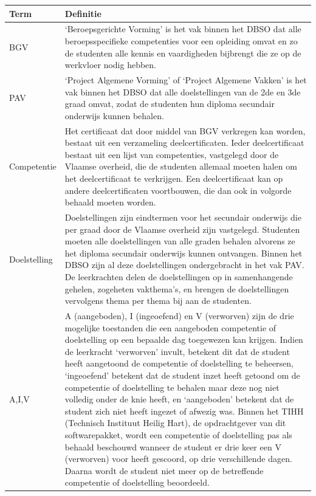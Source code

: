 \documentclass[a4paper]{article}
\begin{document}
\newpage
\begin{tabularx}{\textwidth}{l | X}
    Term & Definitie \\
    \hline \hline
    BGV & `Beroepsgerichte Vorming' is het vak binnen het DBSO dat alle beroepsspecifieke competenties voor een opleiding omvat en zo de studenten alle kennis en vaardigheden bijbrengt die ze op de werkvloer nodig hebben. \\
    \hline
    PAV & `Project Algemene Vorming' of `Project Algemene Vakken' is het vak binnen het DBSO dat alle doelstellingen van de 2de en 3de graad omvat, zodat de studenten hun diploma secundair onderwijs kunnen behalen. \\
    \hline
    Competentie & Het certificaat dat door middel van BGV verkregen kan worden, bestaat uit een verzameling deelcertificaten. Ieder deelcertificaat bestaat uit een lijst van competenties, vastgelegd door de Vlaamse overheid, die de studenten allemaal moeten halen om het deelcertificaat te verkrijgen. Een deelcertificaat kan op andere deelcertificaten voortbouwen, die dan ook in volgorde behaald moeten worden. \cite{Competenties} \\
    \hline
    Doelstelling & Doelstellingen zijn eindtermen voor het secundair onderwijs die per graad door de Vlaamse overheid zijn vastgelegd. Studenten moeten alle doelstellingen van alle graden behalen alvorens ze het diploma secundair onderwijs kunnen ontvangen. Binnen het DBSO zijn al deze doelstellingen ondergebracht in het vak PAV. De leerkrachten delen de doelstellingen op in samenhangende gehelen, zogeheten vakthema's, en brengen de doelstellingen vervolgens thema per thema bij aan de studenten. \cite{Doelstellingen} \\
    \hline
    A,I,V & A (aangeboden), I (ingeoefend) en V (verworven) zijn de drie mogelijke toestanden die een aangeboden competentie of doelstelling op een bepaalde dag toegewezen kan krijgen. Indien de leerkracht `verworven' invult, betekent dit dat de student heeft aangetoond de competentie of doelstelling te beheersen, `ingeoefend' betekent dat de student inzet heeft getoond om de competentie of doelstelling te behalen maar deze nog niet volledig onder de knie heeft, en `aangeboden' betekent dat de student zich niet heeft ingezet of afwezig was. Binnen het TIHH (Technisch Instituut Heilig Hart), de opdrachtgever van dit softwarepakket, wordt een competentie of doelstelling pas als behaald beschouwd wanneer de student er drie keer een V (verworven) voor heeft gescoord, op drie verschillende dagen. Daarna wordt de student niet meer op de betreffende competentie of doelstelling beoordeeld.
\end{tabularx}
\end{document}
